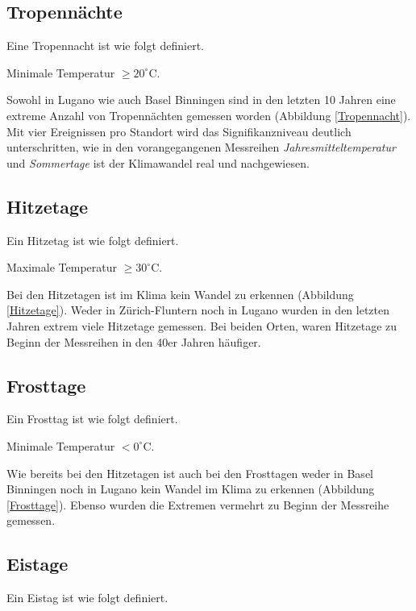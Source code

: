 \begin{refsection}
\subsection{Tropennächte}
Eine Tropennacht ist wie folgt definiert.

\begin{definition}
Minimale Temperatur $\ge 20^{\circ}$C.
\end{definition}

Sowohl in Lugano wie auch Basel Binningen sind in den letzten 10 Jahren eine extreme Anzahl von Tropennächten gemessen worden (Abbildung \ref{Tropennacht}). Mit vier Ereignissen pro Standort wird das Signifikanzniveau deutlich unterschritten, wie in den vorangegangenen Messreihen {\em Jahresmitteltemperatur} und {\em Sommertage} ist der Klimawandel real und nachgewiesen.


\subsection{Hitzetage}
Ein Hitzetag ist wie folgt definiert.

\begin{definition}
Maximale Temperatur $\ge 30^{\circ}$C.
\end{definition}

Bei den Hitzetagen ist im Klima kein Wandel zu erkennen (Abbildung \ref{Hitzetage}). Weder in Zürich-Fluntern noch in Lugano wurden in den letzten Jahren extrem viele Hitzetage gemessen. Bei beiden Orten, waren Hitzetage zu Beginn der Messreihen in den 40er Jahren häufiger.


\subsection{Frosttage}
Ein Frosttag ist wie folgt definiert.

\begin{definition}
Minimale Temperatur $< 0^{\circ}$C.
\end{definition}

Wie bereits bei den Hitzetagen ist auch bei den Frosttagen weder in Basel Binningen noch in Lugano kein Wandel im Klima zu erkennen (Abbildung \ref{Frosttage}). Ebenso wurden die Extremen vermehrt zu Beginn der Messreihe gemessen.


\subsection{Eistage}
%
Ein Eistag ist wie folgt definiert.


\end{refsection}
